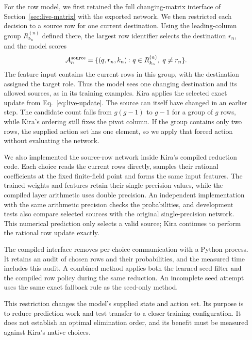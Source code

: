 For the row model, we first retained the full changing-matrix interface
of Section~\ref{sec:live-matrix} with the exported network. We then
restricted each decision to a source row for one current destination.
Using the leading-column group $R_{k_n}^{(n)}$ defined there, the largest
row identifier selects the destination $r_n$, and the model scores
\begin{equation}
 \mathcal A_n^{\rm source}
 =\{(q,r_n,k_n):q\in R_{k_n}^{(n)},\ q\ne r_n\}.
\end{equation}
The feature input contains the current rows in this group, with the
destination assigned the target role. Thus the model sees one changing
destination and its allowed sources, as in its training examples.
Kira applies the selected exact update from
Eq.~\eqref{eq:live-update}. The source can itself have changed in an
earlier step. The candidate count falls from $g(g-1)$ to $g-1$ for a
group of $g$ rows, while Kira's ordering still fixes the pivot column.
If the group contains only two rows, the supplied action set has one
element, so we apply that forced action without evaluating the network.

We also implemented the source-row network inside Kira's compiled
reduction code. Each choice reads the current rows directly, samples
their rational coefficients at the fixed finite-field point and forms
the same input features. The trained weights and features retain their
single-precision values, while the compiled layer arithmetic uses
double precision. An independent implementation with the same
arithmetic precision checks the probabilities, and development tests
also compare selected sources with the original single-precision
network. This numerical prediction only selects a valid source; Kira
continues to perform the rational row update exactly.

The compiled interface removes per-choice communication with a Python
process. It retains an audit of chosen rows and their probabilities,
and the measured time includes this audit. A combined method applies
both the learned seed filter and the compiled row policy during the
same reduction. An incomplete seed attempt uses the same exact
fallback rule as the seed-only method.


This restriction changes the model's supplied state and action set.
Its purpose is to reduce prediction work and test transfer to a
closer training configuration. It does not establish an optimal
elimination order, and its benefit must be measured against Kira's
native choices.

